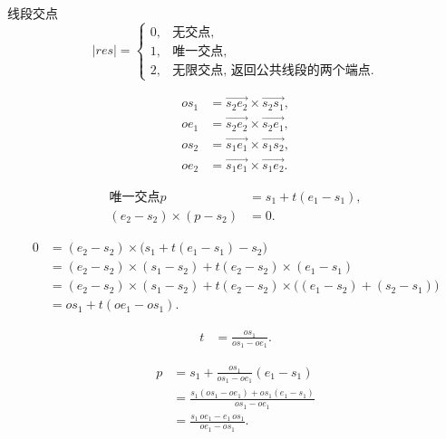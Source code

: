	\begin{lecture}{线段交点}
	\[
	|res|=
	\begin{cases}
		0, & \text{无交点},\\
		1, & \text{唯一交点},\\
		2, & \text{无限交点, 返回公共线段的两个端点}.
	\end{cases}
	\]

	\[
	\begin{aligned}
		os_1 &= \overrightarrow{s_2e_2}\times\overrightarrow{s_2s_1},\\
		oe_1 &= \overrightarrow{s_2e_2}\times\overrightarrow{s_2e_1},\\
		os_2 &= \overrightarrow{s_1e_1}\times\overrightarrow{s_1s_2},\\
		oe_2 &= \overrightarrow{s_1e_1}\times\overrightarrow{s_1e_2}.
	\end{aligned}
	\]

	\[
	\begin{aligned}
		\text{唯一交点}p &= s_1+t(e_1-s_1),\\
		(e_2-s_2)\times(p-s_2)&=0.
	\end{aligned}
	\]

	\[
	\begin{aligned}
	0
	&=(e_2-s_2)\times\bigl(s_1+t(e_1-s_1)-s_2\bigr)\\
	&=(e_2-s_2)\times(s_1-s_2)
		+t(e_2-s_2)\times(e_1-s_1)\\
	&=(e_2-s_2)\times(s_1-s_2)
		+t(e_2-s_2)\times\bigl((e_1-s_2)+(s_2-s_1)\bigr)\\
	&=os_1+t(oe_1-os_1).
	\end{aligned}
	\]

	\[
	\begin{aligned}
	t&=\frac{os_1}{os_1-oe_1}.
	\end{aligned}
	\]

	\[
	\begin{aligned}
	p
	&=s_1+\frac{os_1}{os_1-oe_1}(e_1-s_1)\\
	&=\frac{s_1(os_1-oe_1)+os_1(e_1-s_1)}{os_1-oe_1}\\
	&=\frac{s_1\,oe_1-e_1\,os_1}{oe_1-os_1}.
	\end{aligned}
	\]
	\end{lecture}


